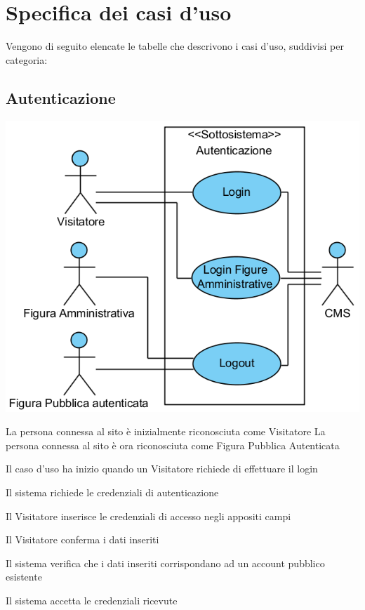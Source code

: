 \section{Specifica dei casi d'uso}
Vengono di seguito elencate le tabelle che descrivono i casi d'uso, suddivisi per categoria:

\subsection{Autenticazione}
\begin{center}
   \includegraphics[width=\textwidth]{assets/visualParadigm/cu/Autenticazione}
\end{center}
%
{}%
{La persona connessa al sito è inizialmente riconosciuta come Visitatore}%
{La persona connessa al sito è ora riconosciuta come Figura Pubblica Autenticata}%
{\begin{enumCU}
	\item Il caso d'uso ha inizio quando un Visitatore richiede di effettuare il login 
	\item Il sistema richiede le credenziali di autenticazione
	\item Il Visitatore inserisce le credenziali di accesso negli appositi campi \label{culogin:3}
	\item Il Visitatore conferma i dati inseriti
	\item Il sistema verifica che i dati inseriti corrispondano ad un account pubblico esistente\label{culogin:5}
	\item Il sistema accetta le credenziali ricevute
\end{enumCU}}%
